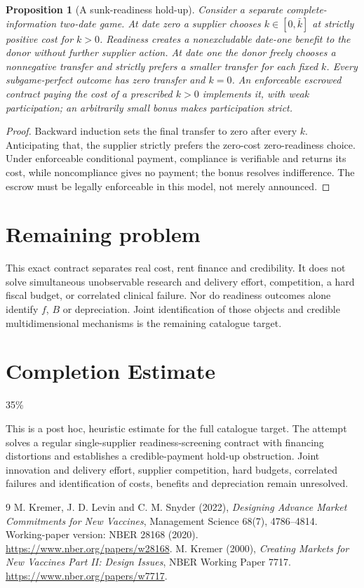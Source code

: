 \documentclass[11pt]{article}
\newtheorem{proposition}[theorem]{Proposition}
\theoremstyle{definition}
\begin{document}
\begin{proposition}[A sunk-readiness hold-up]
Consider a separate complete-information two-date game. At date zero a supplier
chooses $k\in[0,\bar k]$ at strictly positive cost for $k>0$. Readiness creates
a nonexcludable date-one benefit to the donor without further supplier action.
At date one the donor freely chooses a nonnegative transfer and strictly
prefers a smaller transfer for each fixed $k$. Every subgame-perfect outcome
has zero transfer and $k=0$. An enforceable escrowed contract paying the
cost of a prescribed $k>0$ implements it, with weak participation; an
arbitrarily small bonus makes participation strict.
\end{proposition}
\begin{proof}
Backward induction sets the final transfer to zero after every $k$.
Anticipating that, the supplier strictly prefers the zero-cost zero-readiness
choice. Under enforceable conditional payment, compliance is verifiable and
returns its cost, while noncompliance gives no payment; the bonus resolves
indifference. The escrow must be legally enforceable in this model, not
merely announced.
\end{proof}

\section*{Remaining problem}
This exact contract separates real cost, rent finance and credibility. It does
not solve simultaneous unobservable research and delivery effort, competition,
a hard fiscal budget, or correlated clinical failure. Nor do readiness outcomes
alone identify $f$, $B$ or depreciation. Joint identification of those objects
and credible multidimensional mechanisms is the remaining catalogue target.

\section{Completion Estimate}
35\%

This is a post hoc, heuristic estimate for the full catalogue target.
The attempt solves a regular single-supplier readiness-screening contract with financing distortions and establishes a credible-payment hold-up obstruction. Joint innovation and delivery effort, supplier competition, hard budgets, correlated failures and identification of costs, benefits and depreciation remain unresolved.

\begin{thebibliography}{9}
 M. Kremer, J. D. Levin and C. M. Snyder (2022),
\emph{Designing Advance Market Commitments for New Vaccines}, Management
Science 68(7), 4786--4814. Working-paper version: NBER 28168 (2020).
\url{https://www.nber.org/papers/w28168}.
 M. Kremer (2000), \emph{Creating Markets for New Vaccines
Part II: Design Issues}, NBER Working Paper 7717.
\url{https://www.nber.org/papers/w7717}.
\end{thebibliography}
\end{document}
